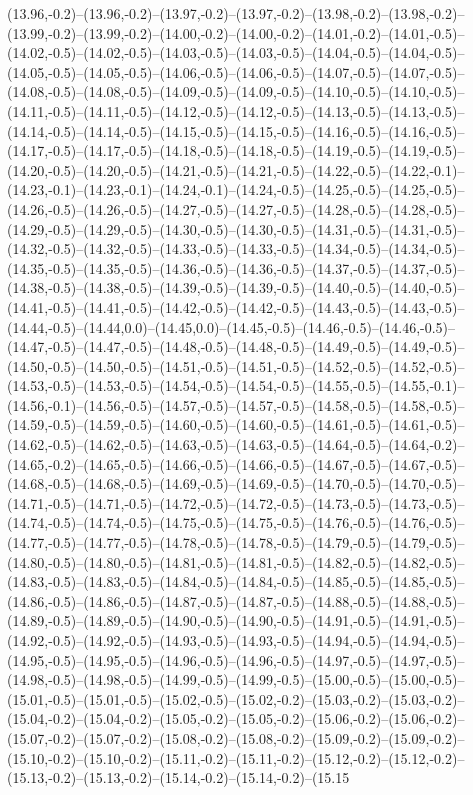 (13.96,-0.2)--(13.96,-0.2)--(13.97,-0.2)--(13.97,-0.2)--(13.98,-0.2)--(13.98,-0.2)--(13.99,-0.2)--(13.99,-0.2)--(14.00,-0.2)--(14.00,-0.2)--(14.01,-0.2)--(14.01,-0.5)--(14.02,-0.5)--(14.02,-0.5)--(14.03,-0.5)--(14.03,-0.5)--(14.04,-0.5)--(14.04,-0.5)--(14.05,-0.5)--(14.05,-0.5)--(14.06,-0.5)--(14.06,-0.5)--(14.07,-0.5)--(14.07,-0.5)--(14.08,-0.5)--(14.08,-0.5)--(14.09,-0.5)--(14.09,-0.5)--(14.10,-0.5)--(14.10,-0.5)--(14.11,-0.5)--(14.11,-0.5)--(14.12,-0.5)--(14.12,-0.5)--(14.13,-0.5)--(14.13,-0.5)--(14.14,-0.5)--(14.14,-0.5)--(14.15,-0.5)--(14.15,-0.5)--(14.16,-0.5)--(14.16,-0.5)--(14.17,-0.5)--(14.17,-0.5)--(14.18,-0.5)--(14.18,-0.5)--(14.19,-0.5)--(14.19,-0.5)--(14.20,-0.5)--(14.20,-0.5)--(14.21,-0.5)--(14.21,-0.5)--(14.22,-0.5)--(14.22,-0.1)--(14.23,-0.1)--(14.23,-0.1)--(14.24,-0.1)--(14.24,-0.5)--(14.25,-0.5)--(14.25,-0.5)--(14.26,-0.5)--(14.26,-0.5)--(14.27,-0.5)--(14.27,-0.5)--(14.28,-0.5)--(14.28,-0.5)--(14.29,-0.5)--(14.29,-0.5)--(14.30,-0.5)--(14.30,-0.5)--(14.31,-0.5)--(14.31,-0.5)--(14.32,-0.5)--(14.32,-0.5)--(14.33,-0.5)--(14.33,-0.5)--(14.34,-0.5)--(14.34,-0.5)--(14.35,-0.5)--(14.35,-0.5)--(14.36,-0.5)--(14.36,-0.5)--(14.37,-0.5)--(14.37,-0.5)--(14.38,-0.5)--(14.38,-0.5)--(14.39,-0.5)--(14.39,-0.5)--(14.40,-0.5)--(14.40,-0.5)--(14.41,-0.5)--(14.41,-0.5)--(14.42,-0.5)--(14.42,-0.5)--(14.43,-0.5)--(14.43,-0.5)--(14.44,-0.5)--(14.44,0.0)--(14.45,0.0)--(14.45,-0.5)--(14.46,-0.5)--(14.46,-0.5)--(14.47,-0.5)--(14.47,-0.5)--(14.48,-0.5)--(14.48,-0.5)--(14.49,-0.5)--(14.49,-0.5)--(14.50,-0.5)--(14.50,-0.5)--(14.51,-0.5)--(14.51,-0.5)--(14.52,-0.5)--(14.52,-0.5)--(14.53,-0.5)--(14.53,-0.5)--(14.54,-0.5)--(14.54,-0.5)--(14.55,-0.5)--(14.55,-0.1)--(14.56,-0.1)--(14.56,-0.5)--(14.57,-0.5)--(14.57,-0.5)--(14.58,-0.5)--(14.58,-0.5)--(14.59,-0.5)--(14.59,-0.5)--(14.60,-0.5)--(14.60,-0.5)--(14.61,-0.5)--(14.61,-0.5)--(14.62,-0.5)--(14.62,-0.5)--(14.63,-0.5)--(14.63,-0.5)--(14.64,-0.5)--(14.64,-0.2)--(14.65,-0.2)--(14.65,-0.5)--(14.66,-0.5)--(14.66,-0.5)--(14.67,-0.5)--(14.67,-0.5)--(14.68,-0.5)--(14.68,-0.5)--(14.69,-0.5)--(14.69,-0.5)--(14.70,-0.5)--(14.70,-0.5)--(14.71,-0.5)--(14.71,-0.5)--(14.72,-0.5)--(14.72,-0.5)--(14.73,-0.5)--(14.73,-0.5)--(14.74,-0.5)--(14.74,-0.5)--(14.75,-0.5)--(14.75,-0.5)--(14.76,-0.5)--(14.76,-0.5)--(14.77,-0.5)--(14.77,-0.5)--(14.78,-0.5)--(14.78,-0.5)--(14.79,-0.5)--(14.79,-0.5)--(14.80,-0.5)--(14.80,-0.5)--(14.81,-0.5)--(14.81,-0.5)--(14.82,-0.5)--(14.82,-0.5)--(14.83,-0.5)--(14.83,-0.5)--(14.84,-0.5)--(14.84,-0.5)--(14.85,-0.5)--(14.85,-0.5)--(14.86,-0.5)--(14.86,-0.5)--(14.87,-0.5)--(14.87,-0.5)--(14.88,-0.5)--(14.88,-0.5)--(14.89,-0.5)--(14.89,-0.5)--(14.90,-0.5)--(14.90,-0.5)--(14.91,-0.5)--(14.91,-0.5)--(14.92,-0.5)--(14.92,-0.5)--(14.93,-0.5)--(14.93,-0.5)--(14.94,-0.5)--(14.94,-0.5)--(14.95,-0.5)--(14.95,-0.5)--(14.96,-0.5)--(14.96,-0.5)--(14.97,-0.5)--(14.97,-0.5)--(14.98,-0.5)--(14.98,-0.5)--(14.99,-0.5)--(14.99,-0.5)--(15.00,-0.5)--(15.00,-0.5)--(15.01,-0.5)--(15.01,-0.5)--(15.02,-0.5)--(15.02,-0.2)--(15.03,-0.2)--(15.03,-0.2)--(15.04,-0.2)--(15.04,-0.2)--(15.05,-0.2)--(15.05,-0.2)--(15.06,-0.2)--(15.06,-0.2)--(15.07,-0.2)--(15.07,-0.2)--(15.08,-0.2)--(15.08,-0.2)--(15.09,-0.2)--(15.09,-0.2)--(15.10,-0.2)--(15.10,-0.2)--(15.11,-0.2)--(15.11,-0.2)--(15.12,-0.2)--(15.12,-0.2)--(15.13,-0.2)--(15.13,-0.2)--(15.14,-0.2)--(15.14,-0.2)--(15.15